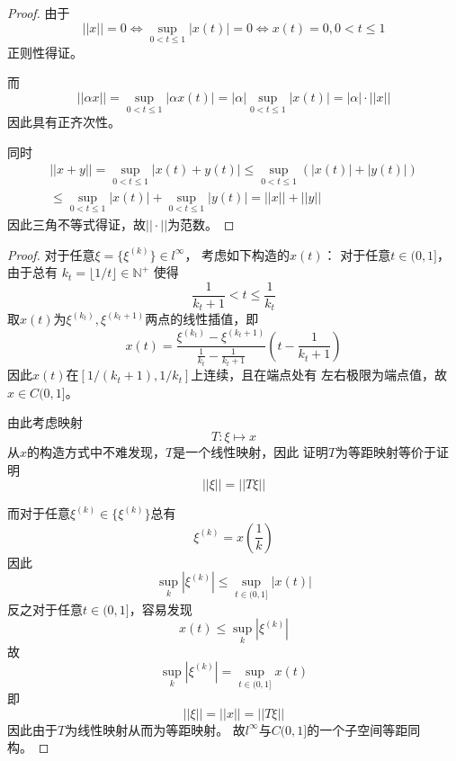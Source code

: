 \documentclass[cn]{homework}
\begin{document}
    \problem
    \begin{subproblem}[(\arabic*)]
        \item
        \begin{proof}
            由于
            \[||x||=0\Leftrightarrow\sup_{0<t\leq 1}|x(t)|=0
            \Leftrightarrow x(t)=0,0<t\leq 1\]
            正则性得证。

            而
            \[||\alpha x||=\sup_{0<t\leq 1}|\alpha x(t)|
            =|\alpha|\sup_{0<t\leq 1}|x(t)|=|\alpha|\cdot||x||\]
            因此具有正齐次性。

            同时
            \begin{multline*}
                ||x+y||=\sup_{0<t\leq 1}|x(t)+y(t)|
                \leq\sup_{0<t\leq 1}(|x(t)|+|y(t)|)\\
                \leq\sup_{0<t\leq 1}|x(t)|+\sup_{0<t\leq 1}|y(t)|
                =||x||+||y||
            \end{multline*}
            因此三角不等式得证，故$||\cdot||$为范数。
        \end{proof}

        \item
        \begin{proof}
            对于任意$\xi=\{\xi^{(k)}\}\in l^\infty$，
            考虑如下构造的$x(t)$：
            对于任意$t\in(0,1]$，由于总有
            $k_t=\lfloor1/t\rfloor\in\mathbb N^+$
            使得
            \[\frac{1}{k_t+1}<t\leq\frac{1}{k_t}\]
            取$x(t)$为$\xi^{(k_t)},\xi^{(k_t+1)}$两点的线性插值，即
            \[x(t)=\frac{\xi^{(k_t)}-\xi^{(k_t+1)}}{\frac{1}{k_t}-\frac{1}{k_t+1}}
            \left(t-\frac{1}{k_t+1}\right)\]
            因此$x(t)$在$[1/(k_t+1),1/k_t]$上连续，且在端点处有
            左右极限为端点值，故$x\in C(0,1]$。

            由此考虑映射
            \[T:\xi\mapsto x\]
            从$x$的构造方式中不难发现，$T$是一个线性映射，因此
            证明$T$为等距映射等价于证明
            \[||\xi||=||T\xi||\]

            而对于任意$\xi^{(k)}\in\{\xi^{(k)}\}$总有
            \[\xi^{(k)}=x\left(\frac{1}{k}\right)\]
            因此
            \[\sup_{k}|\xi^{(k)}|\leq\sup_{t\in(0,1]}|x(t)|\]
            反之对于任意$t\in(0,1]$，容易发现
            \[x(t)\leq\sup_{k}|\xi^{(k)}|\]
            故
            \[\sup_{k}|\xi^{(k)}|=\sup_{t\in(0,1]}x(t)\]
            即
            \[||\xi||=||x||=||T\xi||\]
            因此由于$T$为线性映射从而为等距映射。
            故$l^\infty$与$C(0,1]$的一个子空间等距同构。
        \end{proof}
    \end{subproblem}
\end{document}
